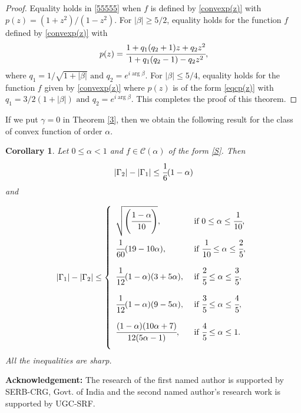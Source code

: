 \documentclass[a4paper,12pt]{amsart}
\newtheorem{corollary}[theorem]{Corollary}
\theoremstyle{definition}
\numberwithin{equation}{section}
\begin{document}
\begin{proof}
\medskip

\noindent Equality holds in \eqref{55555} when $f$ is defined by \eqref{convexp(z)} with $p(z)=(1+z^2)/(1-z^2)$. For $|\beta|\ge 5/2$, equality holds for the function $f$ defined by \eqref{convexp(z)} with
\begin{equation}\label{eqcp(z)}
p(z)=\cfrac{1+q_1(q_2+1)z+q_2z^2}{1+q_1(q_2-1)-q_2z^2},
\end{equation}
where $
q_1=1/\sqrt{1+|\beta|} \mbox{ and } q_2=e^{i\arg \beta}$.
\noindent For $|\beta|\le 5/4$, equality holds for the function $f$ given by \eqref{convexp(z)} where $p(z)$ is of the form \eqref{eqcp(z)} with 
 $q_1=3/2(1+|\beta|) \mbox{ and } q_2=e^{i\arg \beta}$.
\noindent This completes the proof of this theorem.
\end{proof}
If we put  $\gamma=0$ in Theorem \ref{3}, then we obtain the following result for the class of convex function of order $\alpha$.
\begin{corollary}\label{4}
Let $0 \le \alpha < 1$ and  $f\in \mathcal{C}(\alpha)$ of the form \eqref{S}. Then
\begin{equation}
|\Gamma_2|-|\Gamma_1|\le \cfrac{1}{6}(1-\alpha)
\end{equation}
and

\begin{equation}
|\Gamma_1|-|\Gamma_2|\le\left \{
\begin{array}{lllll}
\sqrt{\left(\cfrac{1-\alpha}{10}\right)}, & {\mbox{ if }} 0 \le \alpha \le \cfrac{1}{10},\\[5mm]
\cfrac{1}{60}(19-10\alpha), & {\mbox{ if }} \cfrac{1}{10} \le \alpha \le \cfrac{2}{5},\\[5mm]
\cfrac{1}{12}(1-\alpha)(3+5\alpha), &{\mbox{ if }} \cfrac{2}{5} \le \alpha \le \cfrac{3}{5},\\[5mm]
\cfrac{1}{12}(1-\alpha)(9-5\alpha), & {\mbox{ if }} \cfrac{3}{5} \le \alpha \le \cfrac{4}{5},\\[5mm]
\cfrac{(1-\alpha)(10\alpha+7)}{12(5\alpha-1)}, & {\mbox{ if }} \cfrac{4}{5} \le \alpha  \le 1.\\[5mm]
\end{array}
\right.
\end{equation}
All the inequalities are sharp.
\end{corollary}

{\bf Acknowledgement:}
The research of the first named author is supported by SERB-CRG, Govt. of India and the second named author's research work is supported by UGC-SRF.
	
\end{document}
